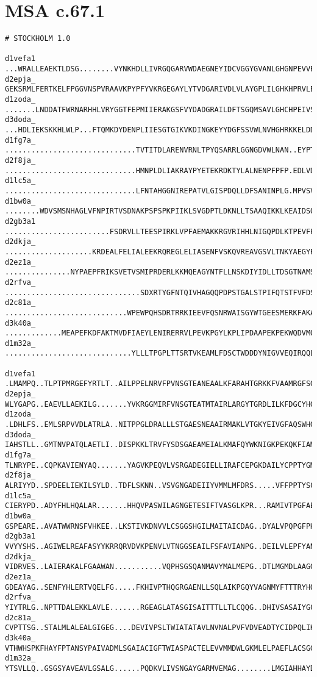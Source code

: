 \chapter{MSA c.67.1}
\label{app:MSAc671}

\begin{lstlisting}[basicstyle=\scriptsize\ttfamily, caption=MSA c.67.1,label=abbMSA67]
# STOCKHOLM 1.0

d1vefa1 ...WRALLEAEKTLDSG........VYNKHDLLIVRGQGARVWDAEGNEYIDCVGGYGVANLGHGNPEVVEAVKRQAET.
d2epja_ GEKSRMLFERTKELFPGGVNSPVRAAVKPYPFYVKRGEGAYLYTVDGARIVDLVLAYGPLILGHKHPRVLEAVEEALARG
d1zoda_ .......LNDDATFWRNARHHLVRYGGTFEPMIIERAKGSFVYDADGRAILDFTSGQMSAVLGHCHPEIVSVIGEYAGK.
d3doda_ ...HDLIEKSKKHLWLP...FTQMKDYDENPLIIESGTGIKVKDINGKEYYDGFSSVWLNVHGHRKKELDDAIKKQLGK.
d1fg7a_ ..............................TVTITDLARENVRNLTPYQSARRLGGNGDVWLNAN..EYPTAVEFQLTQQ
d2f8ja_ ..............................HMNPLDLIAKRAYPYETEKRDKTYLALNENPFPFP.EDLVDEVFRRLNSD
d1lc5a_ ..............................LFNTAHGGNIREPATVLGISPDQLLDFSANINPLG.MPVSVKRALIDNLD
d1bw0a_ ........WDVSMSNHAGLVFNPIRTVSDNAKPSPSPKPIIKLSVGDPTLDKNLLTSAAQIKKLKEAIDSQECNGYFPTV
d2gb3a1 ........................FSDRVLLTEESPIRKLVPFAEMAKKRGVRIHHLNIGQPDLKTPEVFFERIYENKPE
d2dkja_ ....................KRDEALFELIALEEKRQREGLELIASENFVSKQVREAVGSVLTNKYAEGYPGARYYGGCE
d2ez1a_ ...............NYPAEPFRIKSVETVSMIPRDERLKKMQEAGYNTFLLNSKDIYIDLLTDSGTNAMSDKQWAGMMM
d2rfva_ ...............................SDXRTYGFNTQIVHAGQQPDPSTGALSTPIFQTSTFVFDSAEQGAARFG
d2c81a_ ............................WPEWPQHSDRTRRKIEEVFQSNRWAISGYWTGEESMERKFAKAFADFNGVPY
d3k40a_ .............MEAPEFKDFAKTMVDFIAEYLENIRERRVLPEVKPGYLKPLIPDAAPEKPEKWQDVMQDIERVIMPG
d1m32a_ .............................YLLLTPGPLTTSRTVKEAMLFDSCTWDDDYNIGVVEQIRQQLTALATASEG

d1vefa1 .LMAMPQ..TLPTPMRGEFYRTLT..AILPPELNRVFPVNSGTEANEAALKFARAHTGRKKFVAAMRGFSGRTMGSLSVT
d2epja_ WLYGAPG..EAEVLLAEKILG.......YVKRGGMIRFVNSGTEATMTAIRLARGYTGRDLILKFDGCYHGSHDAVLVAA
d1zoda_ .LDHLFS..EMLSRPVVDLATRLA..NITPPGLDRALLLSTGAESNEAAIRMAKLVTGKYEIVGFAQSWHGMTGAAASAT
d3doda_ IAHSTLL..GMTNVPATQLAETLI..DISPKKLTRVFYSDSGAEAMEIALKMAFQYWKNIGKPEKQKFIAMKSYKAPIPY
d1fg7a_ TLNRYPE..CQPKAVIENYAQ.......YAGVKPEQVLVSRGADEGIELLIRAFCEPGKDAILYCPPTYGMYSVSAETIG
d2f8ja_ ALRIYYD..SPDEELIEKILSYLD..TDFLSKNN..VSVGNGADEIIYVMMLMFDRS.....VFFPPTYSCYRIFAKAVG
d1lc5a_ CIERYPD..ADYFHLHQALAR.......HHQVPASWILAGNGETESIFTVASGLKPR...RAMIVTPGFAEYGRALAQSG
d1bw0a_ GSPEARE..AVATWWRNSFVHKEE..LKSTIVKDNVVLCSGGSHGILMAITAICDAG..DYALVPQPGFPHYETVCKAYG
d2gb3a1 VVYYSHS..AGIWELREAFASYYKRRQRVDVKPENVLVTNGGSEAILFSFAVIANPG..DEILVLEPFYANYNAFAKIAG
d2dkja_ VIDRVES..LAIERAKALFGAAWAN...........VQPHSGSQANMAVYMALMEPG..DTLMGMDLAAGGHLTHGSRVN
d2ez1a_ GDEAYAG..SENFYHLERTVQELFG.....FKHIVPTHQGRGAENLLSQLAIKPGQYVAGNMYFTTTRYHQEKNGAVFVD
d2rfva_ YIYTRLG..NPTTDALEKKLAVLE.......RGEAGLATASGISAITTTLLTLCQQG..DHIVSASAIYGCTHAFLSHSM
d2c81a_ CVPTTSG..STALMLALEALGIGEG....DEVIVPSLTWIATATAVLNVNALPVFVDVEADTYCIDPQLIKSAITDKTKA
d3k40a_ VTHWHSPKFHAYFPTANSYPAIVADMLSGAIACIGFTWIASPACTELEVVMMDWLGKMLELPAEFLACSGGKGGGVIQGT
d1m32a_ YTSVLLQ..GSGSYAVEAVLGSALG......PQDKVLIVSNGAYGARMVEMAG........LMGIAHHAYDCGEVARPDV


\end{lstlisting}
